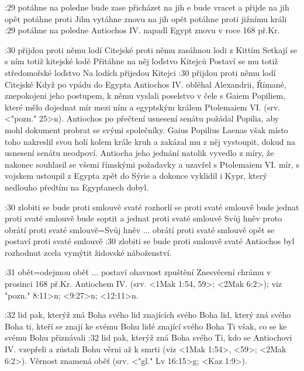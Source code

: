 :29
    {potáhne na poledne}   %
    {bude zase přicházet na jih}   %
    {e bude vracet a přijde na jih}   %
    {opět potáhne proti Jihu}   %
    {vytáhne znovu na jih}  %
    {opět potáhne proti jižnímu králi}   %
:29 {potáhne na poledne}
    Antiochos IV. napadl Egypt znovu v roce 168 př.Kr.
    
:30
    {přijdou proti němu lodí Citejské}  %
    {proti němu zasáhnou lodi z Kittím}   %
    {Setkají se s ním totiž kitejské lodě}  %
    {Přitáhne na něj loďstvo Kitejců}   %
    {Postaví se mu totiž středomořské loďstvo}   %
    {Na lodích přijedou Kitejci}   %
:30 {přijdou proti němu lodí Citejské}
    Když po vpádu do Egypta Antiochos IV. obléhal Alexandrii,   Římané, znepokojeni jeho postupem, k němu vyslali poselstvo v čele s Gaiem Popiliem, které mělo dojednat mír mezi ním a egyptským králem Ptolemaiem VI. (srv. <"pozn." 25>n). Antiochos po přečtení usnesení senátu požádal Popilia, aby mohl dokument probrat se svými společníky. Gaius Popilius Laenas však místo toho nakreslil svou holí kolem krále kruh a zakázal mu z něj vystoupit, dokud na usnesení senátu neodpoví. Antiocha jeho jednání natolik vyvedlo z míry, že nakonec souhlasil se všemi římskými požadavky a uzavřel s Ptolemaiem VI. mír, s vojskem ustoupil z Egypta zpět do Sýrie a dokonce vyklidil i Kypr, který nedlouho předtím na Egypťanech dobyl.
    
:30
    {zlobiti se bude proti smlouvě svaté}   %
    {rozhorlí se proti svaté smlouvě}   %
    {bude jednat proti svaté smlouvě}   %
    {bude soptit a jednat proti svaté smlouvě}   %
    {Svůj hněv proto obrátí proti svaté smlouvě}={Svůj hněv ... obrátí proti svaté smlouvě}   %
    {opět se postaví proti svaté smlouvě}  %
:30 {zlobiti se bude proti smlouvě svaté}
    Antiochos byl rozhodnut zcela vymýtit židovské náboženství.
    
    

:31 {obět}={odejmou oběť ... postaví ohavnost zpuštění} 
Znesvěcení chrámu v prosinci 168 př.Kr. Antiochem IV. (srv. <1Mak 1:54, 59>; <2Mak 6:2>); viz \<"pozn." 8:11>n; <9:27>n; <12:11>n.


    
:32
    {lid pak, kterýž zná Boha svého}   %
    {lid znajících svého Boha}   %
    {lid, který zná svého Boha}   %
    {ti, kteří se znají ke svému Bohu}   %
    {lidé znající svého Boha}   %
    {Ti však, co se ke svému Bohu přiznávali}   %
:32 {lid pak, kterýž zná Boha svého}
    Ti, kdo se Antiochovi IV. vzepřeli a zůstali Bohu věrni až k smrti (viz <1Mak 1:54>, <59>; <2Mak 6:2>). Věrnost znamená oběť (srv. 
    <"gl." Lv 16:15>g; <Kaz 1:9>).


